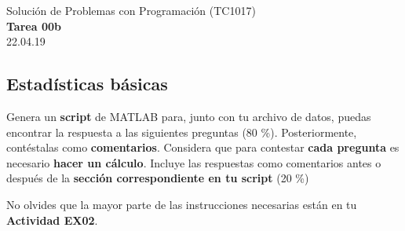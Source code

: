 \documentclass[]{book}
\theoremstyle{definition}
\begin{document}
\begin{center}
{\huge Solución de Problemas con Programación (TC1017)}\\[1.5ex]
{\large \textbf{Tarea 00b}\\[1.5ex] %
22.04.19} %
\end{center}

\vspace{0.2 cm}

\subsection*{Estadísticas básicas}

\bigskip

Genera un \textbf{script} de MATLAB para, junto con tu archivo de datos, puedas encontrar la respuesta a las siguientes preguntas (80 \%).
Posteriormente, contéstalas como \textbf{comentarios}. Considera que para contestar \textbf{cada pregunta} es necesario \textbf{hacer un cálculo}.
Incluye las respuestas como comentarios antes o después de la \textbf{sección correspondiente en tu script} (20 \%)

No olvides que la mayor parte de las instrucciones necesarias están en tu \textbf{Actividad EX02}.

\bigskip
\end{document}
